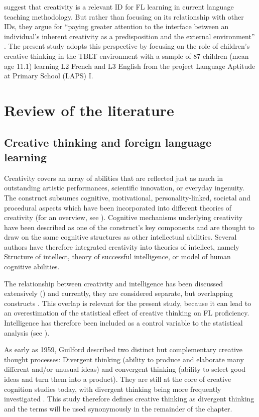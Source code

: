 \documentclass[output=paper]{langsci/langscibook}
\begin{document}
\citet{DoernyeiRyan2015} suggest that creativity is a relevant ID for FL learning in current language teaching methodology. But rather than focusing on its relationship with other IDs, they argue for “paying greater attention to the interface between an individual’s inherent creativity as a predisposition and the external environment” \citep[175]{DoernyeiRyan2015}. The present study adopts this perspective by focusing on the role of children’s creative thinking in the TBLT environment with a sample of 87 children (mean age 11.1) learning L2 French and L3 English from the project Language Aptitude at Primary School (LAPS) I.

\section{Review of the literature}
\subsection{Creative thinking and foreign language learning}\label{sec:06:2.1}

Creativity covers an array of abilities that are reflected just as much in outstanding artistic performances, scientific innovation, or everyday ingenuity. The construct subsumes cognitive, motivational, personality-linked, societal and procedural aspects which have been incorporated into different theories of creativity (for an overview, see \citealt{Lubart1994}). Cognitive mechanisms underlying creativity have been described as one of the construct’s key components \citep{Lubart1994} and are thought to draw on the same cognitive structures as other intellectual abilities. Several authors have therefore integrated creativity into theories of intellect, namely  Structure of intellect,  theory of successful intelligence, or  model of human cognitive abilities.

The relationship between creativity and intelligence has been discussed extensively (\citealt{SternbergOHara1999}) and currently, they are considered separate, but overlapping constructs \citep{Vogt2010}. This overlap is relevant for the present study, because it can lead to an overestimation of the statistical effect of creative thinking on FL proficiency. Intelligence has therefore been included as a control variable to the statistical analysis (see ).

As early as 1959, Guilford described two distinct but complementary creative thought processes: Divergent thinking (ability to produce and elaborate many different and/or unusual ideas) and convergent thinking (ability to select good ideas and turn them into a product). They are still at the core of creative cognition studies today, with divergent thinking being more frequently investigated \citep{Cropley2006}. This study therefore defines creative thinking as divergent thinking and the terms will be used synonymously in the remainder of the chapter.
\end{document}
